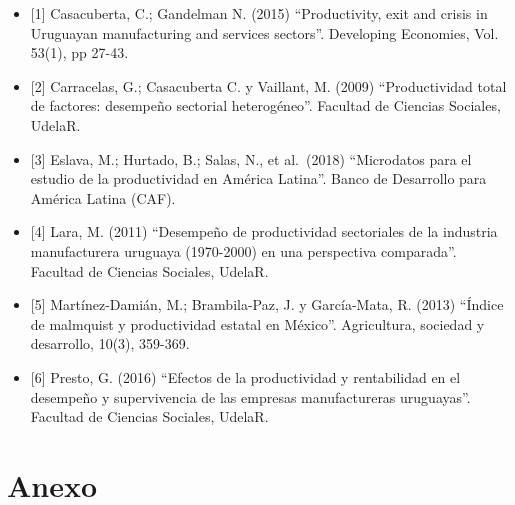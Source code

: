 \documentclass[
]{article}
\begin{document}
\begin{itemize}
\item
  {[}1{]} Casacuberta, C.; Gandelman N. (2015) ``Productivity, exit and
  crisis in Uruguayan manufacturing and services sectors''. Developing
  Economies, Vol. 53(1), pp 27-43.
\item
  {[}2{]} Carracelas, G.; Casacuberta C. y Vaillant, M. (2009)
  ``Productividad total de factores: desempeño sectorial heterogéneo''.
  Facultad de Ciencias Sociales, UdelaR.
\item
  {[}3{]} Eslava, M.; Hurtado, B.; Salas, N., et al.~(2018) ``Microdatos
  para el estudio de la productividad en América Latina''. Banco de
  Desarrollo para América Latina (CAF).
\item
  {[}4{]} Lara, M. (2011) ``Desempeño de productividad sectoriales de la
  industria manufacturera uruguaya (1970-2000) en una perspectiva
  comparada''. Facultad de Ciencias Sociales, UdelaR.
\item
  {[}5{]} Martínez-Damián, M.; Brambila-Paz, J. y García-Mata, R. (2013)
  ``Índice de malmquist y productividad estatal en México''.
  Agricultura, sociedad y desarrollo, 10(3), 359-369.
\item
  {[}6{]} Presto, G. (2016) ``Efectos de la productividad y rentabilidad
  en el desempeño y supervivencia de las empresas manufactureras
  uruguayas''. Facultad de Ciencias Sociales, UdelaR.
\end{itemize}

\hypertarget{anexo}{%
\section{Anexo}\label{anexo}}
\end{document}
